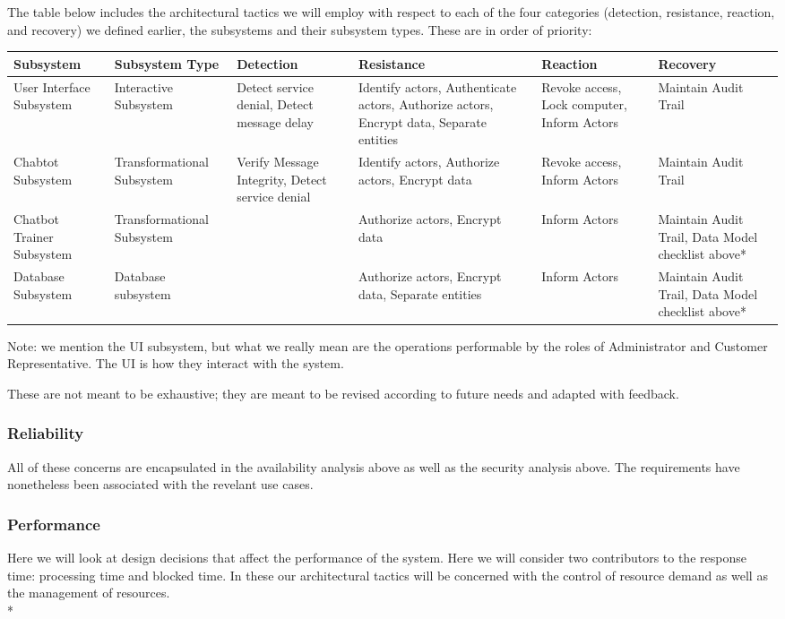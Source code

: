 \documentclass[11pt]{article}
\begin{document}
The table below includes the architectural tactics we will employ with respect to each of the four categories (detection, resistance, reaction, and recovery) we defined earlier, the subsystems and their subsystem types. These are in order of priority:
\begin{center}
	\hspace*{-1.5cm}\begin{tabular}{|p{3cm}|p{3cm}|p{3cm}|p{3cm}|p{3cm}|p{3cm}|}
		\hline
		Subsystem & Subsystem Type & Detection & Resistance & Reaction & Recovery \\
		\hline
		User Interface Subsystem & Interactive Subsystem & Detect service denial, Detect message delay & Identify actors, Authenticate actors, Authorize actors, Encrypt data, Separate entities & Revoke access, Lock computer, Inform Actors & Maintain Audit Trail \\
		\hline
		Chabtot Subsystem & Transformational Subsystem & Verify Message Integrity, Detect service denial & Identify actors, Authorize actors, Encrypt data & Revoke access, Inform Actors & Maintain Audit Trail \\
		\hline
		Chatbot Trainer Subsystem & Transformational Subsystem & & Authorize actors, Encrypt data & Inform Actors & Maintain Audit Trail, Data Model checklist above* \\
		\hline
		Database Subsystem & Database subsystem & & Authorize actors, Encrypt data, Separate entities & Inform Actors & Maintain Audit Trail, Data Model checklist above* \\
		\hline
	\end{tabular}
\end{center}
Note: we mention the UI subsystem, but what we really mean are the operations performable by the roles of Administrator and Customer Representative. The UI is how they interact with the system.

These are not meant to be exhaustive; they are meant to be revised according to future needs and adapted with feedback.

\subsubsection{Reliability}
All of these concerns are encapsulated in the availability analysis above as well as the security analysis above. The requirements have nonetheless been associated with the revelant use cases.

\subsubsection{Performance}
Here we will look at design decisions that affect the performance of the system. Here we will consider two contributors to the response time: processing time and blocked time\cite{Book:2}. In these our architectural tactics will be concerned with the control of resource demand as well as the management of resources. \\*
\end{document}
